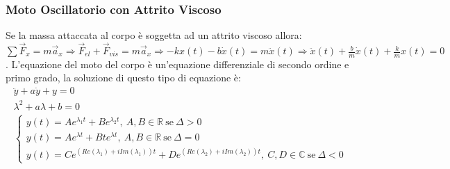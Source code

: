 \documentclass{article}
\numberwithin{equation}{subsection}
\begin{document}
\subsubsection{Moto Oscillatorio con Attrito Viscoso}
Se la massa attaccata al corpo è soggetta ad un attrito viscoso 
allora: $\sum\vec{F}_x=m\vec{a}_x\Rightarrow \vec{F}_{el}+\vec{F}_{vis}=m\vec{a}_x\Rightarrow -kx(t)-b\dot x(t)=m\ddot x(t)\Rightarrow \ddot x(t) +\displaystyle\frac{b}{m}\dot x(t) +\frac{k}{m}x(t)=0$.
L'equazione del moto del corpo è un'equazione differenziale 
di secondo ordine e primo grado, la soluzione di questo tipo 
di equazione è: 
\begin{gather}
    \ddot y + a \dot y+y=0\\
    \lambda^{2}+a\lambda+b=0\\
    \begin{cases}
        \displaystyle y(t)=Ae^{\lambda_1t}+Be^{\lambda_2t},\:A,B\in\mathbb{R}\:\mbox{se}\: \Delta > 0\\
        \displaystyle y(t)=Ae^{\lambda t}+Bte^{\lambda t}, \:A,B\in\mathbb{R}\:\mbox{se}\: \Delta = 0\\
        \displaystyle y(t)=Ce^{(Re(\lambda_1)+iIm(\lambda_1))t} + De^{(Re(\lambda_2)+iIm(\lambda_2))t},\:C,D\in\mathbb{C}\:\mbox{se}\:\Delta < 0
    \end{cases}
\end{gather} 
\end{document}
